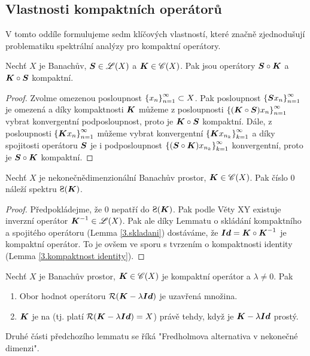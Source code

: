 \subsection{Vlastnosti kompaktních operátorů}
V tomto oddíle formulujeme sedm klíčových vlastností, které značně zjednodušují problematiku spektrální analýzy pro kompaktní operátory.

\begin{lemma} \label{3.skladani}
Nechť $X$ je Banachův, $\boldsymbol{S} \in \mathscr{L} (X)$ a $\boldsymbol{K} \in \mathscr{C}(X)$. Pak jsou operátory $ \boldsymbol{S} \circ \boldsymbol{K}$ a $\boldsymbol{K} \circ \boldsymbol{S}$ kompaktní.
\end{lemma}

\begin{proof}
Zvolme omezenou posloupnost $\left \lbrace x_n \right \rbrace_{n=1}^\infty \subset X$. Pak posloupnost $\left \lbrace \boldsymbol{S} x_n \right \rbrace_{n=1}^\infty$ je omezená a díky kompaktnosti $\boldsymbol{K}$ můžeme z posloupnosti $\left \lbrace (\boldsymbol{K} \circ \boldsymbol{S}) x_n \right \rbrace_{n=1}^\infty$ vybrat konvergentní podposloupnost, proto je $\boldsymbol{K} \circ \boldsymbol{S}$ kompaktní. Dále, z  posloupnosti $\left \lbrace \boldsymbol{K} x_n \right \rbrace_{n=1}^\infty$ můžeme vybrat konvergentní $\left \lbrace \boldsymbol{K} x_{n_k} \right \rbrace_{k=1}^\infty$ a díky spojitosti operátoru $\boldsymbol{S}$ je i podposloupnost $\left \lbrace (\boldsymbol{S} \circ \boldsymbol{K}) x_{n_k} \right \rbrace_{k=1}^\infty$ konvergentní, proto je $\boldsymbol{S} \circ \boldsymbol{K}$ kompaktní.

\end{proof}

\begin{lemma}
Nechť $X$ je nekonečnědimenzionální Banachův prostor, $\boldsymbol{K} \in \mathscr{C}(X)$. Pak číslo $0$ náleží spektru $\Sp(\map K)$.
\end{lemma}

\begin{proof}
Předpokládejme, že $0$ nepatří do $\Sp(\map K)$. Pak podle Věty XY existuje inverzní operátor $ \boldsymbol{K}^{-1} \in \mathscr{L}(X)$. Pak ale díky Lemmatu o skládání kompaktního a spojitého operátoru (Lemma \ref{3.skladani}) dostáváme, že $\boldsymbol{Id} = \boldsymbol{K} \circ \boldsymbol{K}^{-1}$ je kompaktní operátor. To je ovšem ve sporu s tvrzením o kompaktnosti identity (Lemma \ref{3.kompaktnost identity}).
\end{proof}

\begin{lemma}
Nechť $X$ je Banachův prostor, $\boldsymbol{K} \in \mathscr{C}(X)$ je kompaktní operátor a $\lambda \neq 0$. Pak \begin{enumerate}
    \item Obor hodnot operátoru $\mathcal{R}(\boldsymbol{K} - \lambda \boldsymbol{Id})$ je uzavřená množina.
    \item $\boldsymbol{K}$ je na (tj. platí $\mathcal{R}(\boldsymbol{K} - \lambda \boldsymbol{Id} )=X$) právě tehdy, když je $\boldsymbol{K} - \lambda \boldsymbol{Id}$ prostý.
\end{enumerate}
\end{lemma}
\begin{remark}
Druhé části předchozího lemmatu se říká "Fredholmova alternativa v nekonečné dimenzi".
\end{remark}

